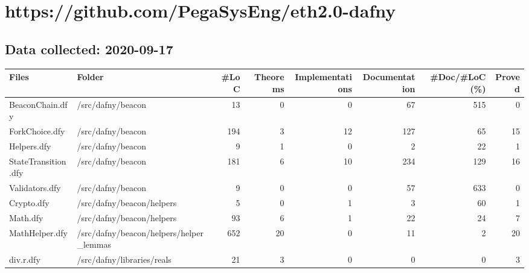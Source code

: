 \documentclass[a4paper, 12pt]{article}
\begin{document}
\section*{https://github.com/PegaSysEng/eth2.0-dafny}
\subsection*{Data collected: 2020-09-17}
\scriptsize
\begin{tabular}{llrrrrrr}
\toprule
                           Files &                                          Folder &  \#LoC &  Theorems &  Implementations &  Documentation &  \#Doc/\#LoC (\%) &  Proved \\
\midrule
                 BeaconChain.dfy &                               /src/dafny/beacon &    13 &         0 &                0 &             67 &            515 &       0 \\
                  ForkChoice.dfy &                               /src/dafny/beacon &   194 &         3 &               12 &            127 &             65 &      15 \\
                     Helpers.dfy &                               /src/dafny/beacon &     9 &         1 &                0 &              2 &             22 &       1 \\
             StateTransition.dfy &                               /src/dafny/beacon &   181 &         6 &               10 &            234 &            129 &      16 \\
                  Validators.dfy &                               /src/dafny/beacon &     9 &         0 &                0 &             57 &            633 &       0 \\
                      Crypto.dfy &                       /src/dafny/beacon/helpers &     5 &         0 &                1 &              3 &             60 &       1 \\
                        Math.dfy &                       /src/dafny/beacon/helpers &    93 &         6 &                1 &             22 &             24 &       7 \\
                  MathHelper.dfy &         /src/dafny/beacon/helpers/helper\_lemmas &   652 &        20 &                0 &             11 &              2 &      20 \\
                       div.r.dfy &                      /src/dafny/libraries/reals &    21 &         3 &                0 &              0 &              0 &       3 \\

\end{tabular}
\end{document}
